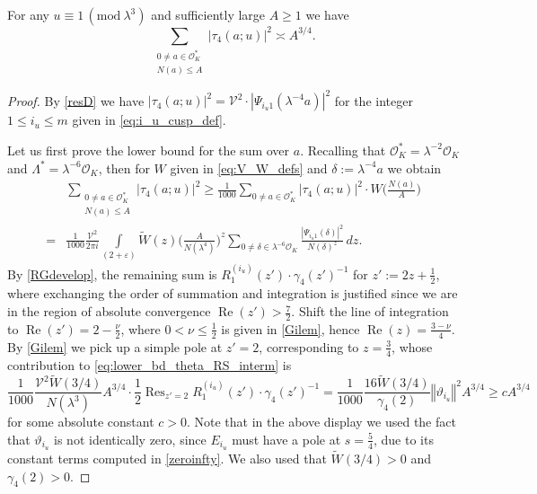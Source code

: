 \documentclass[12pt,reqno]{amsart}
\numberwithin{equation}{section}
\renewcommand{\Re}{\operatorname{Re}}
\renewcommand{\pmod}[1]{\, (\mathrm{mod}\ #1)}
\newcommand\norm[1]{\left\Vert {#1} \right\Vert}
\DeclareMathOperator*{\Res}{Res}
\begin{document}
\begin{prop} \label{prop:tau_4_second_moment}
    For any $u \equiv 1 \pmod{\lambda^3}$ and sufficiently large $A\geq 1$ we have
    \begin{equation*}
        \sum_{\substack{0 \neq a \in \mathcal{O}^*_K \\ N(a) \leq A}} |\tau_4(a ; u)|^2 \asymp A^{3/4}.
    \end{equation*}
\end{prop}

\begin{proof}
    By \eqref{resD} we have $|{\tau_4(a; u)}|^2 = \mathcal{V}^{2}\cdot |\Psi_{i_u 1}(\lambda^{-4} a)|^2$ for the integer $1 \leq i_u \leq m$ given in \eqref{eq:i_u_cusp_def}. 
    
    Let us first prove the lower bound for the sum over $a$. Recalling that $\mathcal{O}_K^* = \lambda^{-2} \mathcal{O}_K$ and $\Lambda^* = \lambda^{-6} \mathcal{O}_K$, then for $W$ given in \eqref{eq:V_W_defs} and $\delta := \lambda^{-4} a$ we obtain
    \begin{align}
        & \sum_{\substack{0 \neq a \in \mathcal{O}^*_K \\ N(a) \leq A}} |\tau_4(a ; u)|^2 \geq \frac{1}{1000} \sum_{0 \neq a \in \mathcal{O}^*_K } |\tau_4(a ; u)|^2 \cdot W \Big( \frac{N(a)}{A} \Big) \nonumber \\
        = & \frac{1}{1000} \frac{\mathcal{V}^{2}}{2\pi i} \int\limits_{(2 + \varepsilon)} \widetilde{W}(z)  \Big(\frac{A}{N(\lambda^4)}\Big)^{z} \sum_{0 \neq \delta \in \lambda^{-6} \mathcal{O}_K} \frac{|\Psi_{i_u 1}(\delta)|^2}{N(\delta)^z} \, dz. \label{eq:lower_bd_theta_RS_interm}
    \end{align}
By \eqref{RGdevelop}, the remaining sum is $R_1^{(i_u)}(z') \cdot \gamma_4(z')^{-1}$ for $z' := 2z+\frac{1}{2}$, where exchanging the order of summation and integration is justified since we are in the region of absolute convergence $\Re(z') > \frac{7}{2}$. Shift the line of integration to $\Re(z') = 2-\frac{\nu}{2}$, where $0< \nu \leq \frac{1}{2}$ is given in \cref{Gilem}, hence $\Re(z) = \frac{3 -\nu}{4}$. By \cref{Gilem} we pick up a simple pole at $z'=2$, corresponding to $z=\frac{3}{4}$, whose contribution to \eqref{eq:lower_bd_theta_RS_interm} is
    \begin{equation}\label{eq:main_term_theta}
    \frac{1}{1000} \frac{\mathcal{V}^2 \widetilde{W}(3/4)}{N(\lambda^3)} A^{3/4} \cdot \frac{1}{2} \Res_{z'=2} R_1^{(i_u)}(z') \cdot \gamma_4(z')^{-1} = \frac{1}{1000} \frac{16 \widetilde{W}(3/4)}{\gamma_4(2)} \norm{\vartheta_{i_u}}^2 A^{3/4} \geq c A^{3/4}
    \end{equation}
    for some absolute constant $c>0$. Note that in the above display we used the fact that $\vartheta_{i_u}$ is not identically zero, since $E_{i_u}$ must have a pole at $s = \frac{5}{4}$, due to its constant terms computed in \eqref{zeroinfty}. We also used that $\widetilde{W}(3/4)>0$ and $\gamma_4(2)>0$.


\end{proof}
\end{document}

